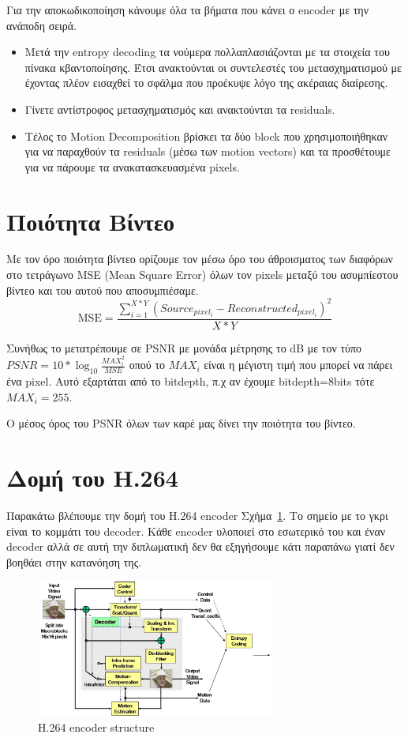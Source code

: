 \indent Για την αποκωδικοποίηση κάνουμε όλα τα βήματα που κάνει ο encoder με την ανάποδη σειρά.

\begin{itemize}
  \item Μετά την entropy decoding τα νούμερα πολλαπλασιάζονται με τα στοιχεία του πίνακα κβαντοποίησης. Έτσι ανακτούνται οι συντελεστές του μετασχηματισμού με έχοντας πλέον εισαχθεί το σφάλμα που προέκυψε λόγο της ακέραιας διαίρεσης.
  \item Γίνετε αντίστροφος μετασχηματισμός και ανακτούνται τα residuals.
  \item Τέλος το Motion Decomposition βρίσκει τα δύο block που χρησιμοποιήθηκαν για να παραχθούν τα residuals (μέσω των motion vectors) και τα προσθέτουμε για να πάρουμε τα ανακατασκευασμένα pixels.
\end{itemize}

\section{Ποιότητα Βίντεο}
\label{section:sect27}

\indent Με τον όρο ποιότητα βίντεο ορίζουμε τον μέσω όρο του άθροισματος των διαφόρων στο τετράγωνο MSE (Mean Square Error) όλων τον pixels μεταξύ του ασυμπίεστου βίντεο και του αυτού που αποσυμπιέσαμε. \begin{equation}
\text{MSE} =
\frac{\displaystyle\sum_{i=1}^{X*Y}
(Source_{pixel_i}-Reconstructed_{pixel_i})^{2}}{X*Y}
\end{equation}

\indent Συνήθως το μετατρέπουμε σε PSNR με μονάδα μέτρησης το \si{}{dB} με τον τύπο  $ PSNR = 10*\log_{10}{\frac{MAX_i^2}{MSE}}$ οπού το $MAX_i$ είναι η μέγιστη τιμή που μπορεί να πάρει ένα pixel. Αυτό εξαρτάται από το bitdepth, π.χ αν έχουμε bitdepth=8bits τότε $ MAX_i=255$.

\indent Ο μέσος όρος του PSNR όλων των καρέ μας δίνει την ποιότητα του βίντεο.

\section{Δομή του Η.264}
\label{section:sect28}

\indent Παρακάτω βλέπουμε την δομή του H.264 encoder Σχήμα~\ref{fig:h264}. Το σημείο με το γκρι είναι το κομμάτι του decoder. Κάθε encoder υλοποιεί στο εσωτερικό του και έναν decoder αλλά σε αυτή την διπλωματική δεν θα εξηγήσουμε κάτι παραπάνω γιατί δεν βοηθάει στην κατανόηση της.

\begin{figure}[h]
    \centering
    \includegraphics[width=0.7\textwidth]{chapter2/h264.jpg}
    \caption{H.264 encoder structure}
    \label{fig:h264}
\end{figure}
